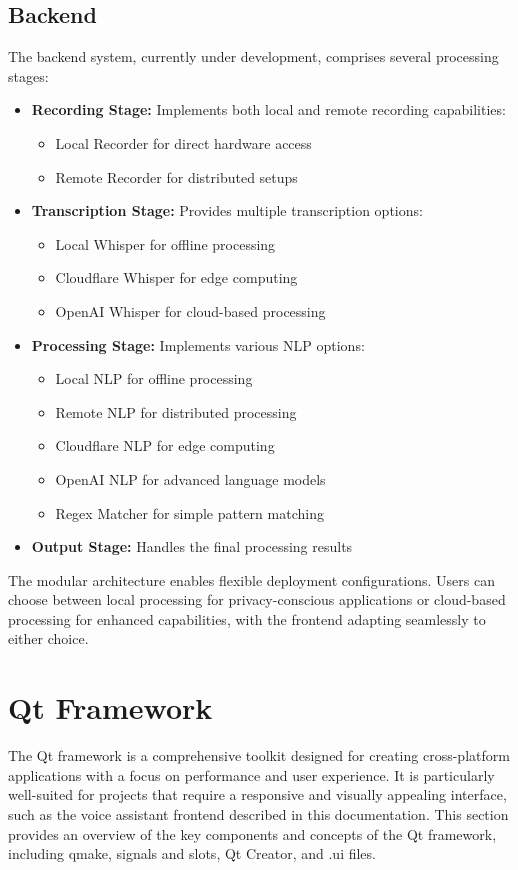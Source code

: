 \subsection{Backend}
The backend system, currently under development, comprises several processing stages:
\begin{itemize}
    \item \textbf{Recording Stage:} Implements both local and remote recording capabilities:
    \begin{itemize}
        \item Local Recorder for direct hardware access
        \item Remote Recorder for distributed setups
    \end{itemize}
    \item \textbf{Transcription Stage:} Provides multiple transcription options:
    \begin{itemize}
        \item Local Whisper for offline processing
        \item Cloudflare Whisper for edge computing
        \item OpenAI Whisper for cloud-based processing
    \end{itemize}
    \item \textbf{Processing Stage:} Implements various NLP options:
    \begin{itemize}
        \item Local NLP for offline processing
        \item Remote NLP for distributed processing
        \item Cloudflare NLP for edge computing
        \item OpenAI NLP for advanced language models
        \item Regex Matcher for simple pattern matching
    \end{itemize}
    \item \textbf{Output Stage:} Handles the final processing results
\end{itemize}

The modular architecture enables flexible deployment configurations. Users can choose between local processing for privacy-conscious applications or cloud-based processing for enhanced capabilities, with the frontend adapting seamlessly to either choice.



\section{Qt Framework}
The Qt framework is a comprehensive toolkit designed for creating cross-platform applications
with a focus on performance and user experience.
It is particularly well-suited for projects that require a responsive and visually appealing interface,
such as the voice assistant frontend described in this documentation.
This section provides an overview of the key components and concepts of the Qt framework,
including qmake, signals and slots, Qt Creator, and .ui files.

